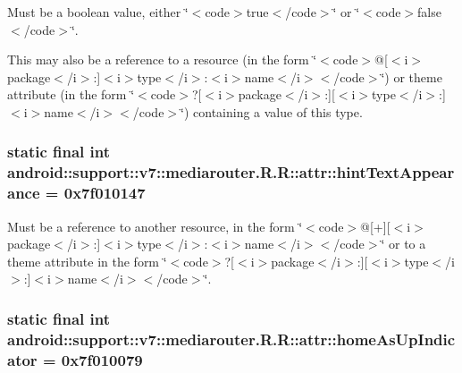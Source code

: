 Must be a boolean value, either \char`\"{}$<$code$>$true$<$/code$>$\char`\"{} or \char`\"{}$<$code$>$false$<$/code$>$\char`\"{}. 

This may also be a reference to a resource (in the form \char`\"{}$<$code$>$@\mbox{[}$<$i$>$package$<$/i$>$:\mbox{]}$<$i$>$type$<$/i$>$:$<$i$>$name$<$/i$>$$<$/code$>$\char`\"{}) or theme attribute (in the form \char`\"{}$<$code$>$?\mbox{[}$<$i$>$package$<$/i$>$:\mbox{]}\mbox{[}$<$i$>$type$<$/i$>$:\mbox{]}$<$i$>$name$<$/i$>$$<$/code$>$\char`\"{}) containing a value of this type. \hypertarget{classandroid_1_1support_1_1v7_1_1mediarouter_1_1_r_1_1attr_8faa4650cf4565021522094ec9fa60fe}{
\subsubsection[{hintTextAppearance}]{\setlength{\rightskip}{0pt plus 5cm}static final int android::support::v7::mediarouter.R.R::attr::hintTextAppearance = 0x7f010147}}
\label{classandroid_1_1support_1_1v7_1_1mediarouter_1_1_r_1_1attr_8faa4650cf4565021522094ec9fa60fe}


Must be a reference to another resource, in the form \char`\"{}$<$code$>$@\mbox{[}+\mbox{]}\mbox{[}$<$i$>$package$<$/i$>$:\mbox{]}$<$i$>$type$<$/i$>$:$<$i$>$name$<$/i$>$$<$/code$>$\char`\"{} or to a theme attribute in the form \char`\"{}$<$code$>$?\mbox{[}$<$i$>$package$<$/i$>$:\mbox{]}\mbox{[}$<$i$>$type$<$/i$>$:\mbox{]}$<$i$>$name$<$/i$>$$<$/code$>$\char`\"{}. \hypertarget{classandroid_1_1support_1_1v7_1_1mediarouter_1_1_r_1_1attr_ab77e97339524f00db34ef5ad2b03f94}{
\subsubsection[{homeAsUpIndicator}]{\setlength{\rightskip}{0pt plus 5cm}static final int android::support::v7::mediarouter.R.R::attr::homeAsUpIndicator = 0x7f010079}}
\label{classandroid_1_1support_1_1v7_1_1mediarouter_1_1_r_1_1attr_ab77e97339524f00db34ef5ad2b03f94}



